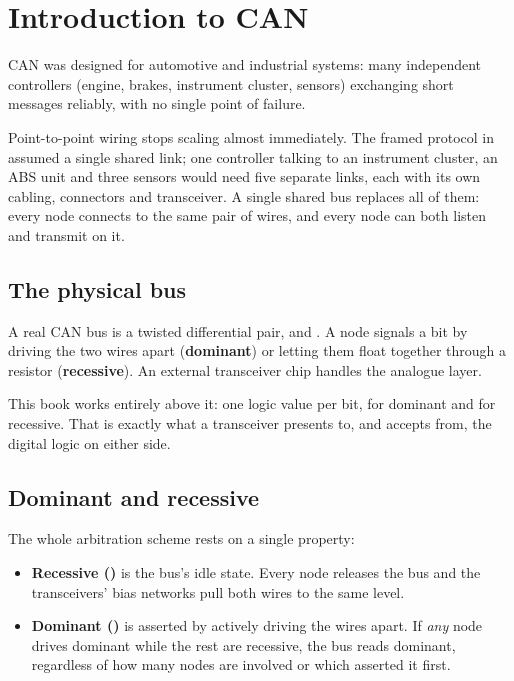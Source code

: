 
\section{Introduction to CAN}
\label{c10:sec:can}

CAN was designed for automotive and industrial systems: many independent controllers (engine,
brakes, instrument cluster, sensors) exchanging short messages reliably, with no single point of
failure.

Point-to-point wiring stops scaling almost immediately. The framed protocol in
 assumed a single shared link; one controller talking to an instrument
cluster, an ABS unit and three sensors would need five separate links, each with its own cabling,
connectors and transceiver. A single shared bus replaces all of them: every node connects to the
same pair of wires, and every node can both listen and transmit on it.

\subsection*{The physical bus}
A real CAN bus is a twisted differential pair,  and . A node signals a bit by
driving the two wires apart (\textbf{dominant}) or letting them float together through a resistor
(\textbf{recessive}). An external transceiver chip handles the analogue layer.

This book works entirely above it: one logic value per bit,  for dominant and  for
recessive. That is exactly what a transceiver presents to, and accepts from, the digital logic on
either side.

\subsection*{Dominant and recessive}
The whole arbitration scheme rests on a single property:
\begin{itemize}
  \item \textbf{Recessive ()} is the bus's idle state. Every node releases the bus and the
    transceivers' bias networks pull both wires to the same level.
  \item \textbf{Dominant ()} is asserted by actively driving the wires apart. If
    \emph{any} node drives dominant while the rest are recessive, the bus reads dominant, regardless
    of how many nodes are involved or which asserted it first.
\end{itemize}

